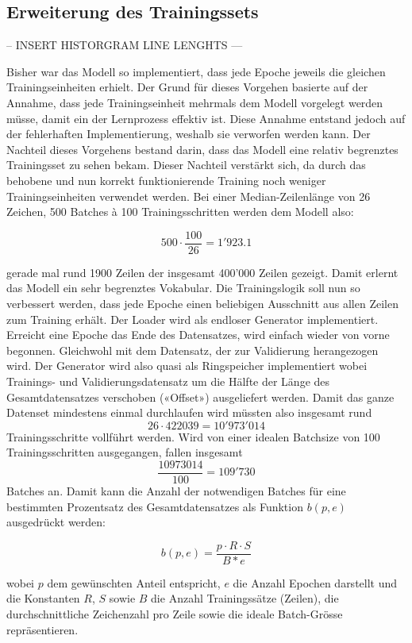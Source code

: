 \subsection{Erweiterung des Trainingssets}
\label{subsec:enhancing-training-set}

-- INSERT HISTORGRAM LINE LENGHTS ---

Bisher war das Modell so implementiert, dass jede Epoche jeweils die gleichen Trainingseinheiten erhielt.
Der Grund für dieses Vorgehen basierte auf der Annahme, dass jede Trainingseinheit mehrmals dem Modell vorgelegt werden müsse, damit
ein der Lernprozess effektiv ist.
Diese Annahme entstand jedoch auf der fehlerhaften Implementierung, weshalb sie verworfen werden kann.
Der Nachteil dieses Vorgehens bestand darin, dass das Modell eine relativ begrenztes Trainingsset zu sehen bekam.
Dieser Nachteil verstärkt sich, da durch das behobene und nun korrekt funktionierende Training noch weniger Trainingseinheiten verwendet werden.
Bei einer Median-Zeilenlänge von 26 Zeichen, 500 Batches à 100 Trainingsschritten werden dem Modell also:

\[ 500 \cdot \frac{100}{26} = 1'923.1 \]

gerade mal rund 1900 Zeilen der insgesamt 400'000 Zeilen gezeigt.
Damit erlernt das Modell ein sehr begrenztes Vokabular.
Die Trainingslogik soll nun so verbessert werden, dass jede Epoche einen beliebigen Ausschnitt aus allen Zeilen zum Training erhält.
Der Loader wird als endloser Generator implementiert.
Erreicht eine Epoche das Ende des Datensatzes, wird einfach wieder von vorne begonnen.
Gleichwohl mit dem Datensatz, der zur Validierung herangezogen wird.
Der Generator wird also quasi als Ringspeicher implementiert wobei Trainings- und Validierungsdatensatz um die Hälfte der Länge des Gesamtdatensatzes
verschoben («Offset») ausgeliefert werden.
Damit das ganze Datenset mindestens einmal durchlaufen wird müssten also insgesamt rund \[ 26 \cdot 422039 = 10'973'014 \] Trainingsschritte vollführt werden.
Wird von einer idealen Batchsize von 100 Trainingsschritten ausgegangen, fallen insgesamt \[ \frac{10973014}{100} = 109'730 \] Batches an.
Damit kann die Anzahl der notwendigen Batches für eine bestimmten Prozentsatz des Gesamtdatensatzes als Funktion $ b(p, e) $ ausgedrückt werden:

\[ b(p, e) = \frac{p \cdot R \cdot S}{B * e} \]

wobei $ p $ dem gewünschten Anteil entspricht, $ e $ die Anzahl Epochen darstellt und die Konstanten $ R $, $ S $ sowie $ B $ die Anzahl Trainingssätze (Zeilen), die durchschnittliche Zeichenzahl pro Zeile sowie
die ideale Batch-Grösse repräsentieren.

